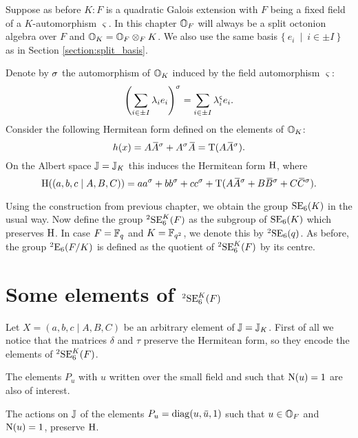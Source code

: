 Suppose as before $K : F$ is a quadratic Galois extension with $F$ being a fixed field of a
$K$-automorphism $\varsigma$. In this chapter $\mathbb{O}_F$ will always be a split octonion algebra 
over $F$ and $\mathbb{O}_K = \mathbb{O}_F \otimes_F K$. We also use the same basis 
$\{\ e_i\ \mid\ i \in \pm I\ \}$ as in Section \ref{section:split_basis}.

Denote by $\sigma$ the automorphism of $\mathbb{O}_K$ induced by the field automorphism 
$\varsigma$:
\begin{equation}
	\left( \sum_{i\in \pm I} \lambda_i e_i \right)^{\sigma} = 
	\sum_{i\in \pm I} \lambda_{i}^{\varsigma} e_i. 
\end{equation}
Consider the following Hermitean form defined on the elements of $\mathbb{O}_K$:
\begin{equation}
	h(x) = A \ovA^{\s} + A^{\s} \ovA = \Tr(A \ovA^{\s}).
\end{equation}
On the Albert space $\mathbb{J} = \mathbb{J}_K$ this induces the Hermitean form $\mathrm{H}$, where
\begin{equation}
	\H( (a,b,c\mid A,B,C) ) = 
		a a^{\s} + b b^{\s} + c c^{\s} + 
		\Tr(A \ovA^{\s} + B\ovB^{\s} + C\ovC^{\s}).
\end{equation}

Using the construction from previous chapter, we obtain the group $\mathrm{SE}_6(K)$ in the usual 
way. Now define the group ${}^2\mathrm{SE}_6^K(F)$ as the subgroup of $\mathrm{SE}_6(K)$ which preserves 
$\mathrm{H}$. In case $F = \mathbb{F}_q$ and $K = \mathbb{F}_{q^2}$, we denote this by ${}^2\mathrm{SE}_6(q)$. As before,
the group ${}^2\mathrm{E}_6(F/K)$ is defined as the quotient of ${}^2\mathrm{SE}_6^K(F)$ by its centre. 

\section{Some elements of ${}^2\mathrm{SE}_6^K(F)$}

Let $X = (a,b,c\mid A,B,C)$ be an arbitrary element of $\mathbb{J} = \mathbb{J}_K$. First of all we notice that 
the matrices $\delta$ and $\tau$ preserve the Hermitean form, so they encode the elements of 
${}^2\mathrm{SE}_6^K(F)$.

The elements $P_u$ with $u$ written over the small field and 
such that $\mathord{\mathrm{N}}(u) = 1$ are also of interest. 

\begin{lemma}
	\label{lemma:3_pu_hermitean}
	The actions on $\mathbb{J}$ of the elements $P_u = \mathrm{diag}(u,\mathord{\mbox{\hspace*{0pt}}\,\overline{\!u\!\!\;}\!\:}\mbox{\hspace*{0pt}},1)$ such that $u \in \mathbb{O}_F$ and $\mathord{\mathrm{N}}(u) = 1$,
	preserve $\mathrm{H}$.
\end{lemma}

